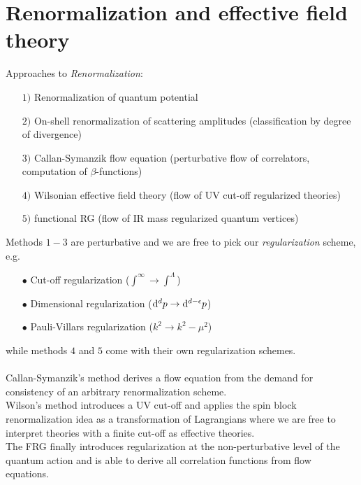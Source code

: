 \newpage

\section{Renormalization and effective field theory}
\label{sec:renormalization}
Approaches to \emph{Renormalization}:
\begin{enumerate}
	\item[$1)$] Renormalization of quantum potential
	\item[$2)$] On-shell renormalization of scattering amplitudes (classification by degree of divergence)
	\item[$3)$] Callan-Symanzik flow equation (perturbative flow of correlators, computation of $\beta$-functions)
	\item[$4)$] Wilsonian effective field theory (flow of UV cut-off regularized theories)
	\item[$5)$]functional RG (flow of IR mass regularized quantum vertices)
\end{enumerate}
Methods $1-3$ are perturbative and we are free to pick our \emph{regularization} scheme, e.g.
\begin{enumerate}
\item[$\bullet$] Cut-off regularization ($\int^\infty \rightarrow \int^\Lambda$)
\item[$\bullet$] Dimensional regularization ($\mathrm{d}^d p \rightarrow \mathrm{d}^{d-\epsilon} p$)
\item[$\bullet$] Pauli-Villars regularization ($k^2\rightarrow k^2-\mu^2$)
\end{enumerate}
while methods $4$ and $5$ come with their own regularization schemes.\\
\\
Callan-Symanzik's method derives a flow equation from the demand for consistency of an arbitrary renormalization scheme.\\
Wilson's method introduces a UV cut-off and applies the spin block renormalization idea as a transformation of Lagrangians where we are free to interpret theories with a finite cut-off as effective theories.\\
The FRG finally introduces regularization at the non-perturbative level of the quantum action and is able to derive all correlation functions from flow equations.\\
\\
